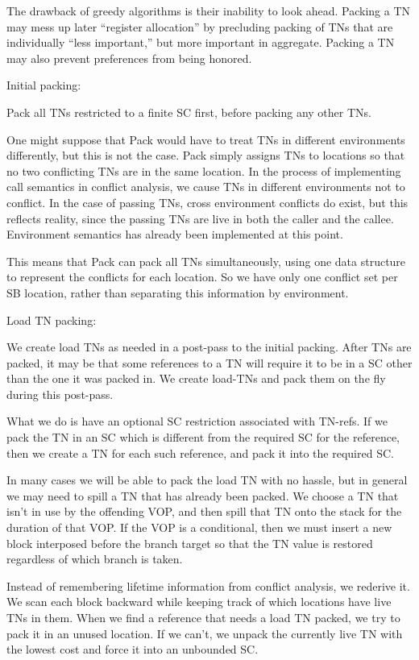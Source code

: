The drawback of greedy algorithms is their inability to look ahead.  Packing a
TN may mess up later ``register allocation'' by precluding packing of TNs that
are individually ``less important,'' but more important in aggregate.  Packing a
TN may also prevent preferences from being honored.


Initial packing:


Pack all TNs restricted to a finite SC first, before packing any other TNs.

One might suppose that Pack would have to treat TNs in different environments
differently, but this is not the case.  Pack simply assigns TNs to locations so
that no two conflicting TNs are in the same location.  In the process of
implementing call semantics in conflict analysis, we cause TNs in different
environments not to conflict.  In the case of passing TNs, cross environment
conflicts do exist, but this reflects reality, since the passing TNs are
live in both the caller and the callee.  Environment semantics has already been
implemented at this point.

This means that Pack can pack all TNs simultaneously, using one data structure
to represent the conflicts for each location.  So we have only one conflict set
per SB location, rather than separating this information by environment.

Load TN packing:

We create load TNs as needed in a post-pass to the initial packing.  After TNs
are packed, it may be that some references to a TN will require it to be in a
SC other than the one it was packed in.  We create load-TNs and pack them on
the fly during this post-pass.  

What we do is have an optional SC restriction associated with TN-refs.  If we
pack the TN in an SC which is different from the required SC for the reference,
then we create a TN for each such reference, and pack it into the required SC.

In many cases we will be able to pack the load TN with no hassle, but in
general we may need to spill a TN that has already been packed.  We choose a
TN that isn't in use by the offending VOP, and then spill that TN onto the
stack for the duration of that VOP.  If the VOP is a conditional, then we must
insert a new block interposed before the branch target so that the TN
value is restored regardless of which branch is taken.

Instead of remembering lifetime information from conflict analysis, we rederive
it.  We scan each block backward while keeping track of which locations have
live TNs in them.  When we find a reference that needs a load TN packed, we try
to pack it in an unused location.  If we can't, we unpack the currently live TN
with the lowest cost and force it into an unbounded SC.

